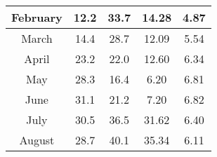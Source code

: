 \documentclass[conference]{IEEEtran}
\begin{document}
\begin{table}[!]
\begin{tabular}{|ccccc|}
\multicolumn{1}{|c|}{February}  & \multicolumn{1}{c|}{12.2}                                                           & \multicolumn{1}{c|}{33.7}                                                         & \multicolumn{1}{c|}{14.28}                                                    & 4.87                                                             \\ \hline
\multicolumn{1}{|c|}{March}     & \multicolumn{1}{c|}{14.4}                                                           & \multicolumn{1}{c|}{28.7}                                                         & \multicolumn{1}{c|}{12.09}                                                    & 5.54                                                             \\ \hline
\multicolumn{1}{|c|}{April}     & \multicolumn{1}{c|}{23.2}                                                           & \multicolumn{1}{c|}{22.0}                                                         & \multicolumn{1}{c|}{12.60}                                                    & 6.34                                                             \\ \hline
\multicolumn{1}{|c|}{May}       & \multicolumn{1}{c|}{28.3}                                                           & \multicolumn{1}{c|}{16.4}                                                         & \multicolumn{1}{c|}{6.20}                                                     & 6.81                                                             \\ \hline
\multicolumn{1}{|c|}{June}      & \multicolumn{1}{c|}{31.1}                                                           & \multicolumn{1}{c|}{21.2}                                                         & \multicolumn{1}{c|}{7.20}                                                     & 6.82                                                             \\ \hline
\multicolumn{1}{|c|}{July}      & \multicolumn{1}{c|}{30.5}                                                           & \multicolumn{1}{c|}{36.5}                                                         & \multicolumn{1}{c|}{31.62}                                                    & 6.40                                                             \\ \hline
\multicolumn{1}{|c|}{August}    & \multicolumn{1}{c|}{28.7}                                                           & \multicolumn{1}{c|}{40.1}                                                         & \multicolumn{1}{c|}{35.34}                                                    & 6.11                                                             \\ \hline

\end{tabular}
\end{table}
\end{document}
